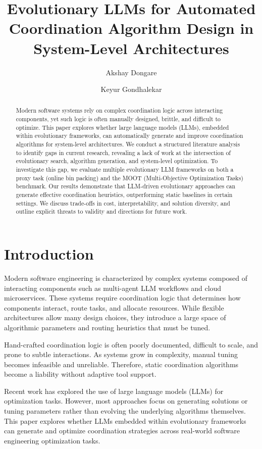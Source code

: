 \documentclass[sigconf,nonacm]{acmart}
\title{Evolutionary LLMs for Automated Coordination Algorithm Design in System-Level Architectures}
\author{Akshay Dongare}
\affiliation{
  \institution{North Carolina State University}
  \city{Raleigh}
  \state{NC}
  \country{USA}
}
\author{Keyur Gondhalekar}
\affiliation{
  \institution{North Carolina State University}
  \city{Raleigh}
  \state{NC}
  \country{USA}
}
\begin{document}
\begin{abstract}
Modern software systems rely on complex coordination logic across interacting components, yet such logic is often manually designed, brittle, and difficult to optimize. This paper explores whether large language models (LLMs), embedded within evolutionary frameworks, can automatically generate and improve coordination algorithms for system-level architectures. We conduct a structured literature analysis to identify gaps in current research, revealing a lack of work at the intersection of evolutionary search, algorithm generation, and system-level optimization. To investigate this gap, we evaluate multiple evolutionary LLM frameworks on both a proxy task (online bin packing) and the MOOT (Multi-Objective Optimization Tasks) benchmark. Our results demonstrate that LLM-driven evolutionary approaches can generate effective coordination heuristics, outperforming static baselines in certain settings. We discuss trade-offs in cost, interpretability, and solution diversity, and outline explicit threats to validity and directions for future work.
\end{abstract}

\maketitle

\section{Introduction}

Modern software engineering is characterized by complex systems composed of interacting components such as multi-agent LLM workflows and cloud microservices. These systems require coordination logic that determines how components interact, route tasks, and allocate resources. While flexible architectures allow many design choices, they introduce a large space of algorithmic parameters and routing heuristics that must be tuned.

Hand-crafted coordination logic is often poorly documented, difficult to scale, and prone to subtle interactions. As systems grow in complexity, manual tuning becomes infeasible and unreliable. Therefore, static coordination algorithms become a liability without adaptive tool support.

Recent work has explored the use of large language models (LLMs) for optimization tasks. However, most approaches focus on generating solutions or tuning parameters rather than evolving the underlying algorithms themselves. This paper explores whether LLMs embedded within evolutionary frameworks can generate and optimize coordination strategies across real-world software engineering optimization tasks.
\end{document}
